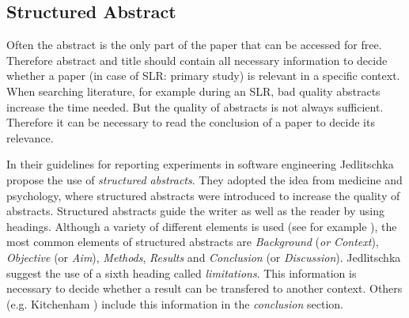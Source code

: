 
\subsection{Structured Abstract}
\label{subsec:structured abstract}

Often the abstract is the only part of the paper that can be accessed for free. Therefore abstract and title should contain all necessary information to decide whether a paper (in case of SLR: primary study) is relevant in a specific context. When searching literature, for example during an SLR, bad quality abstracts increase the time needed. But the quality of abstracts is not always sufficient. Therefore it can be necessary to read the conclusion of a paper to decide its relevance. \cite{Brereton2007}

In their guidelines for reporting experiments in software engineering Jedlitschka \etal \cite{Jedlitschka2008} propose the use of \emph{structured abstracts}. They adopted the idea from medicine and psychology, where structured abstracts were introduced to increase the quality of abstracts. Structured abstracts guide the writer as well as the reader by using headings. Although a variety of different elements is used (see for example ), the most common elements of structured abstracts are \emph{Background} (\emph{or Context}), \emph{Objective} (or \emph{Aim}), \emph{Methods}, \emph{Results} and \emph{Conclusion} (or \emph{Discussion}). Jedlitschka \etal \cite{Jedlitschka2008} suggest the use of a sixth heading called \emph{limitations}. This information is necessary to decide whether a result can be transfered to another context. Others (e.g. Kitchenham \etal \cite{KBO2008}) include this information in the \emph{conclusion} section.

